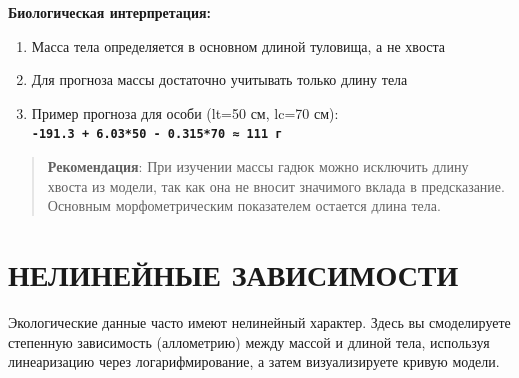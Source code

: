 \documentclass[
  letterpaper,
  DIV=11,
  numbers=noendperiod]{scrreprt}
\begin{document}
\textbf{Биологическая интерпретация:}

\begin{enumerate}
\def\labelenumi{\arabic{enumi}.}
\item
  Масса тела определяется в основном длиной туловища, а не хвоста
\item
  Для прогноза массы достаточно учитывать только длину тела
\item
  Пример прогноза для особи (lt=50 см, lc=70 см):\\
  \textbf{\texttt{-191.3\ +\ 6.03*50\ -\ 0.315*70\ ≈\ 111\ г}}
\end{enumerate}

\begin{quote}
\textbf{Рекомендация}: При изучении массы гадюк можно исключить длину
хвоста из модели, так как она не вносит значимого вклада в предсказание.
Основным морфометрическим показателем остается длина тела.
\end{quote}

\section{НЕЛИНЕЙНЫЕ
ЗАВИСИМОСТИ}\label{ux43dux435ux43bux438ux43dux435ux439ux43dux44bux435-ux437ux430ux432ux438ux441ux438ux43cux43eux441ux442ux438}

Экологические данные часто имеют нелинейный характер. Здесь вы
смоделируете степенную зависимость (аллометрию) между массой и длиной
тела, используя линеаризацию через логарифмирование, а затем
визуализируете кривую модели.
\end{document}

